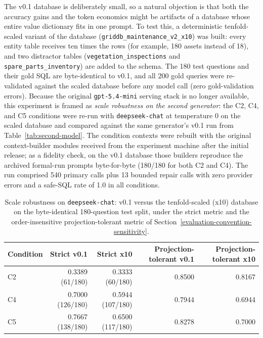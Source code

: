 \documentclass{ieeeaccess}
\begin{document}
The v0.1 database is deliberately small, so a natural objection is that both the accuracy gains and the token economics might be artifacts of a database whose entire value dictionary fits in one prompt. To test this, a deterministic tenfold-scaled variant of the database (\texttt{griddb\_maintenance\_v2\_x10}) was built: every entity table receives ten times the rows (for example, 180 assets instead of 18), and two distractor tables (\texttt{vegetation\_inspections} and \texttt{spare\_parts\_inventory}) are added to the schema. The 180 test questions and their gold SQL are byte-identical to v0.1, and all 200 gold queries were re-validated against the scaled database before any model call (zero gold-validation errors). Because the original \texttt{gpt-5.4-mini} serving stack is no longer available, this experiment is framed as \emph{scale robustness on the second generator}: the C2, C4, and C5 conditions were re-run with \texttt{deepseek-chat} at temperature 0 on the scaled database and compared against the same generator's v0.1 run from Table~\ref{tab:second-model}. The condition contexts were rebuilt with the original context-builder modules received from the experiment machine after the initial release; as a fidelity check, on the v0.1 database those builders reproduce the archived formal-run prompts byte-for-byte (180/180 for both C2 and C4). The run comprised 540 primary calls plus 13 bounded repair calls with zero provider errors and a safe-SQL rate of 1.0 in all conditions.

\begin{table}[t]
\caption{Scale robustness on \texttt{deepseek-chat}: v0.1 versus the tenfold-scaled (x10) database on the byte-identical 180-question test split, under the strict metric and the order-insensitive projection-tolerant metric of Section~\ref{evaluation-convention-sensitivity}.}
\label{tab:x10-comparison}
\centering
\small
\begin{tabular*}{\textwidth}{@{\extracolsep{\fill}}lrrrr}
\toprule
Condition & Strict v0.1 & Strict x10 & Projection-tolerant v0.1 & Projection-tolerant x10 \\
\midrule
C2 & 0.3389 (61/180) & 0.3333 (60/180) & 0.8500 & 0.8167 \\
C4 & 0.7000 (126/180) & 0.5944 (107/180) & 0.7944 & 0.6944 \\
C5 & 0.7667 (138/180) & 0.6500 (117/180) & 0.8278 & 0.7000 \\
\bottomrule
\end{tabular*}
\end{table}
\end{document}
